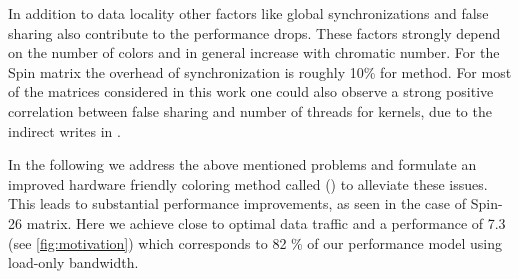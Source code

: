   In addition to data locality other factors like global synchronizations and false sharing also contribute to the performance drops. These factors strongly depend on the number of colors and in general increase with chromatic number. For the Spin matrix the overhead of synchronization is roughly 10\% for \MC method.  For most of the matrices considered in this work one could also observe a strong positive correlation between false sharing and number of threads for \SymmSpmv kernels, due to the indirect writes in \SymmSpmv.
 
 



In the following we address the above mentioned problems and formulate an improved hardware friendly coloring method called \RACfull (\RAC) to alleviate these issues. This leads to substantial performance improvements, as seen in the case of Spin-26 matrix. Here we achieve close to optimal data traffic and a performance of 7.3 \GF(see \cref{fig:motivation}) which corresponds to 82 \% of our performance model using load-only bandwidth.

 


